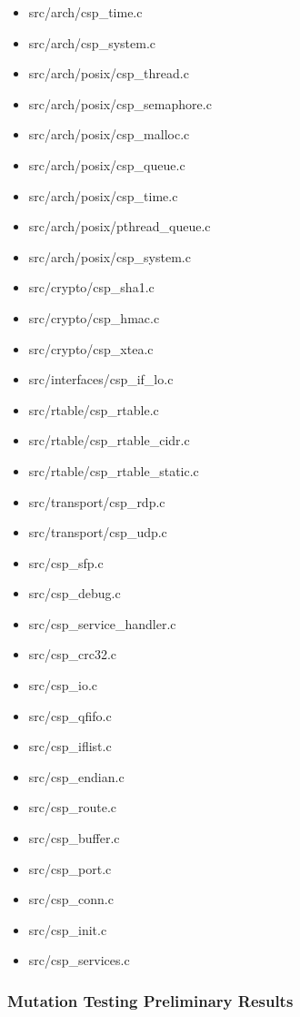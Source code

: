 \begin{enumerate}
	\begin{itemize}
		\item src/arch/csp\_time.c
		\item src/arch/csp\_system.c
		\item src/arch/posix/csp\_thread.c
		\item src/arch/posix/csp\_semaphore.c
		\item src/arch/posix/csp\_malloc.c
		\item src/arch/posix/csp\_queue.c
		\item src/arch/posix/csp\_time.c
		\item src/arch/posix/pthread\_queue.c
		\item src/arch/posix/csp\_system.c
		\item src/crypto/csp\_sha1.c
		\item src/crypto/csp\_hmac.c
		\item src/crypto/csp\_xtea.c
		\item src/interfaces/csp\_if\_lo.c
		\item src/rtable/csp\_rtable.c
		\item src/rtable/csp\_rtable\_cidr.c
		\item src/rtable/csp\_rtable\_static.c
		\item src/transport/csp\_rdp.c
		\item src/transport/csp\_udp.c
		\item src/csp\_sfp.c
		\item src/csp\_debug.c
		\item src/csp\_service\_handler.c
		\item src/csp\_crc32.c
		\item src/csp\_io.c
		\item src/csp\_qfifo.c
		\item src/csp\_iflist.c
		\item src/csp\_endian.c
		\item src/csp\_route.c
		\item src/csp\_buffer.c
		\item src/csp\_port.c
		\item src/csp\_conn.c
		\item src/csp\_init.c
		\item src/csp\_services.c
	\end{itemize}


\end{enumerate}

\subsubsection{Mutation Testing Preliminary Results}


